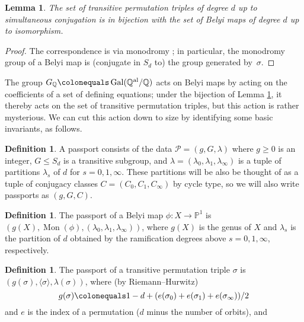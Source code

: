\documentclass{dcthesis}
\newcommand{\PP}{\mathbb P}
\newcommand{\QQ}{\mathbb Q}
\newcommand{\defi}[1]{\textsf{#1}}
\newcommand{\QQal}{{\mathbb Q}^{\textup{al}}}
\DeclareMathOperator{\Mon}{Mon}
\DeclareMathOperator{\Gal}{Gal}
\newtheorem{lemma}[prop]{Lemma}
\theoremstyle{definition}
\newtheorem{definition}[prop]{Definition}
\theoremstyle{remark}
\numberwithin{equation}{section}
\numberwithin{figure}{section}
\begin{document}
{{\begin{lemma}
      \label{lem:simulisom}
      The set of transitive permutation triples of degree $d$ up to simultaneous
      conjugation is in bijection with the set of Belyi maps of degree $d$ up to
      isomorphism.
    \end{lemma}
    \begin{proof}
      The correspondence is via monodromy \cite[Lemma 1.1]{KMSV}; in particular,
      the monodromy group of a Belyi map is (conjugate in $S_d$ to) the group
      generated by~$\sigma$.
    \end{proof}
    The group $G_\QQ\colonequals\Gal(\QQal/ \QQ)$ acts on Belyi maps by acting on the
    coefficients of a set of defining equations; under the bijection of Lemma
    \ref{lem:simulisom}, it thereby acts on the set of transitive permutation
    triples, but this action is rather mysterious.
    We can cut this action down to size by identifying some basic invariants, as
    follows.
    \begin{definition}
      \label{def:passport}
      A \defi{passport} consists of the data $\mathcal{P}=(g,G,\lambda)$
      where $g \geq 0$ is an integer, $G \leq S_d$ is a transitive subgroup, and
      $\lambda=(\lambda_0,\lambda_1,\lambda_\infty)$ is a tuple of partitions
      $\lambda_s$ of $d$ for $s=0,1,\infty$.
      These partitions will be also be
      thought of as a tuple of conjugacy classes $C=(C_0,C_1,C_\infty)$ by cycle
      type, so we will also write passports as $(g,G,C)$.
    \end{definition}
    \begin{definition}
      \label{def:passportofbelyimap}
      The \defi{passport} of a
      Belyi map $\phi\colon X \to \PP^1$ is $(g(X),\Mon(\phi),
      (\lambda_0,\lambda_1,\lambda_\infty))$,
      where $g(X)$ is the genus of $X$ and
      $\lambda_s$ is the partition of $d$ obtained by the ramification degrees above
      $s=0,1,\infty$, respectively.
    \end{definition}
    \begin{definition}
      \label{def:passportofpermutationtriple}
      The \defi{passport} of a transitive
      permutation triple $\sigma$ is
      $(g(\sigma),\langle \sigma \rangle, \lambda(\sigma))$,
      where (by Riemann--Hurwitz)
      \begin{equation}\label{eqn:riemannhurwitzfortriples}
        g(\sigma) \colonequals 1-d+(e(\sigma_0)+e(\sigma_1)+e(\sigma_\infty))/2
      \end{equation}
      and $e$ is the index of a permutation ($d$ minus the number of orbits), and

\end{definition}}}
\end{document}
